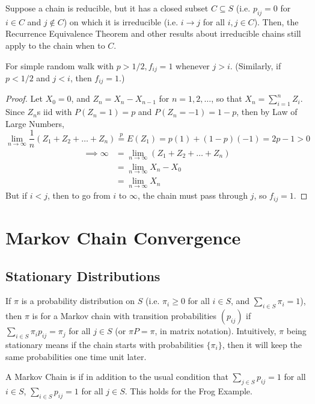 \documentclass[11pt]{article}
\newcommand{\limit}[1]{\underset{{#1} \rightarrow \infty}{\lim}}
\begin{document}
    Suppose a chain is reducible, but it has a closed subset $C \subseteq S$ (i.e. $p_{ij} = 0$ for $i \in C$ and $j \notin C$) on which it is irreducible (i.e. $i \rightarrow j$ for all $i, j \in C$). Then, the Recurrence Equivalence Theorem and other results about irreducible chains still apply to the chain when  to $C$.
    
    \proposition
    For simple random walk with $p > 1/2, f_{ij} = 1$ whenever $j > i$. (Similarly, if $p < 1/2$ and $j < i$, then $f_{ij} = 1$.)
    \begin{proof}
    	Let $X_0 = 0$, and $Z_n = X_n -X_{n-1}$ for $n = 1, 2, \hdots$, so that $X_n = \sum_{i=1}^n Z_i$. \\
    	Since $Z_n$s iid with $P(Z_n = 1) = p$ and $P(Z_n = -1) = 1- p$, then by Law of Large Numbers,
    	$$\limit{n} \frac{1}{n}(Z_1 + Z_2 + \hdots + Z_n) \overset{p}{=} E(Z_1) = p(1) + (1 - p)(-1) = 2p - 1 > 0$$
    	\begin{align*}
    		\implies \infty &= \limit{n}(Z_1 + Z_2 + \hdots + Z_n)\\
    		 &= \limit{n} X_n - X_0 \\
    		 &= \limit{n} X_n
    	\end{align*}
    	But if $i < j$, then to go from $i$ to $\infty$, the chain must pass through $j$, so $f_{ij} = 1$.
    \end{proof}
    
    \section{Markov Chain Convergence}
    \subsection{Stationary Distributions}
    If $\pi$ is a probability distribution on $S$ (i.e. $\pi_i \geq 0$ for all $i \in S$, and $\sum_{i \in S} \pi_i = 1$), then $\pi$ is  for a Markov chain with transition probabilities $(p_{ij})$ if $\sum_{i \in S} \pi_ip_{ij} = \pi_j$ for all $j \in S$ (or $\pi P = \pi$, in matrix notation).
    \remark
    Intuitively, $\pi$ being stationary means if the chain starts with probabilities $\{\pi_i\}$, then it will keep the same probabilities one time unit later.
    
    A Markov Chain is  if in addition to the usual condition that $\sum_{j \in S}p_{ij} = 1$ for all $i \in S$, $\sum_{i \in S}p_{ij} = 1$ for all $j \in S$.
    \remark
    This holds for the Frog Example.
    
\end{document}
